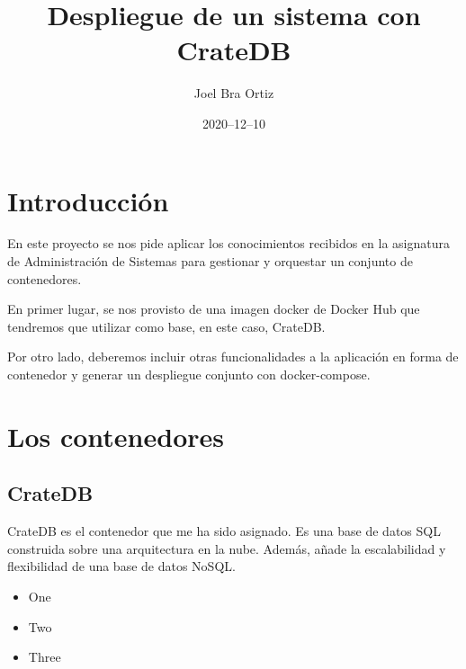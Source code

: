 \documentclass[12pt]{article}
\title{Despliegue de un sistema con CrateDB}
\author{Joel Bra Ortiz}
\date{2020–12–10}
\begin{document}
\maketitle

\section{Introducción}

En este proyecto se nos pide aplicar los conocimientos recibidos en la
asignatura de Administración de Sistemas para gestionar y orquestar un
conjunto de contenedores.

En primer lugar, se nos provisto de una imagen docker de Docker Hub que
tendremos que utilizar como base, en este caso, CrateDB.

Por otro lado, deberemos incluir otras funcionalidades a la aplicación en
forma de contenedor y generar un despliegue conjunto con docker-compose.

\section{Los contenedores}

\subsection[1]{CrateDB}
CrateDB es el contenedor que me ha sido asignado. Es una base de datos SQL
construida sobre una arquitectura en la nube. Además, añade la escalabilidad
y flexibilidad de una base de datos NoSQL.



\begin{itemize}

\item One

\item Two

\item Three

\end{itemize}
\end{document}
